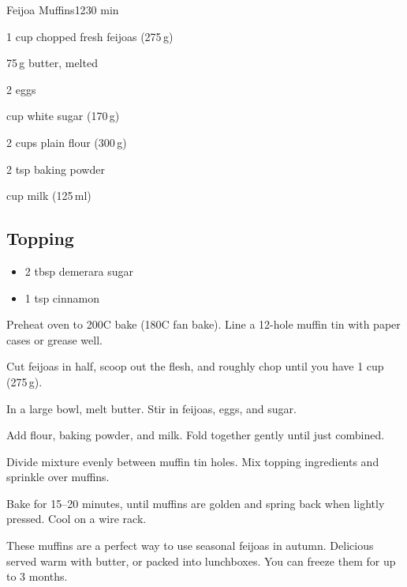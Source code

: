 \begin{recipebox}{Feijoa Muffins}{12}{30 min}
\begin{ingredients}
  \item 1 cup chopped fresh feijoas (275\,g)
  \item 75\,g butter, melted
  \item 2 eggs
  \item {} cup white sugar (170\,g)
  \item 2 cups plain flour (300\,g)
  \item 2 tsp baking powder
  \item {} cup milk (125\,ml)
\end{ingredients}

\subsection*{Topping}
\begin{itemize}[leftmargin=2em]
  \item 2 tbsp demerara sugar
  \item 1 tsp cinnamon
\end{itemize}

\begin{method}
  \item Preheat oven to 200\degree C bake (180\degree C fan bake). Line a 12-hole muffin tin with paper cases or grease well.
  \item Cut feijoas in half, scoop out the flesh, and roughly chop until you have 1 cup (275\,g).
  \item In a large bowl, melt butter. Stir in feijoas, eggs, and sugar.
  \item Add flour, baking powder, and milk. Fold together gently until just combined.
  \item Divide mixture evenly between muffin tin holes. Mix topping ingredients and sprinkle over muffins.
  \item Bake for 15–20 minutes, until muffins are golden and spring back when lightly pressed. Cool on a wire rack.
\end{method}

\begin{notes}
These muffins are a perfect way to use seasonal feijoas in autumn.  
Delicious served warm with butter, or packed into lunchboxes.  
You can freeze them for up to 3 months.  
\end{notes}
\end{recipebox}
